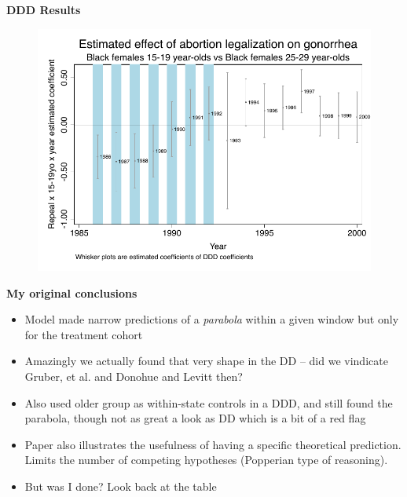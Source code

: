 \documentclass[notes=show]{beamer}
\begin{document}
\begin{frame}[plain]
\begin{center}
\textbf{DDD Results}
\end{center}

	\begin{figure}
	\includegraphics[scale=0.75]{./lecture_includes/bf15_ddd.pdf}
	\end{figure}

\end{frame}

\begin{frame}[plain]
\begin{center}
\textbf{My original conclusions}
\end{center}

\begin{itemize}
\item Model made narrow predictions of a \emph{parabola} within a given window but only for the treatment cohort
\item Amazingly we actually found that very shape in the DD -- did we vindicate Gruber, et al. and Donohue and Levitt then?
\item Also used older group as within-state controls in a DDD, and still found the parabola, though not as great a look as DD which is a bit of a red flag
\item Paper also illustrates the usefulness of having a specific theoretical prediction. Limits the number of competing hypotheses (Popperian type of reasoning). 
\item But was I done? Look back at the table
\end{itemize}

\end{frame}
\end{document}
